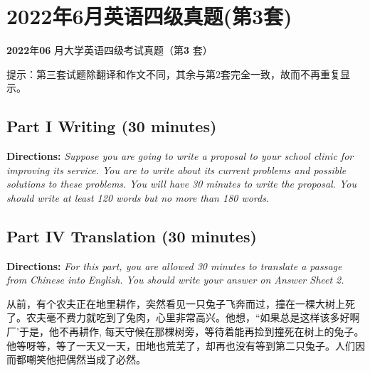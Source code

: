 \documentclass[UTF8,11pt]{ctexart}
\begin{document}
\section*{2022年6月英语四级真题(第3套)}
\textbf{2022}年\textbf{06} 月大学英语四级考试真题（第\textbf{3} 套）


提示：第三套试题除翻译和作文不同，其余与第2套完全一致，故而不再重复显示。


\subsection*{\textbf{Part I} \textbf{Writing} \textbf{(30 minutes)}}


\textbf{Directions: }\textit{Suppose you are going to write a proposal to your school clinic for improving its} \textit{service. You are to write about its current problems and possible solutions to these problems.} \textit{You will have 30 minutes to write the proposal. You should write at least 120 words but no more} \textit{than 180 words.}


\subsection*{\textbf{Part IV} \textbf{Translation} \textbf{(30 minutes)}}


\textbf{Directions: }\textit{For this part, you are allowed 30 minutes to translate a passage from Chinese into} \textit{English. You should write your answer on Answer Sheet 2.}


从前，有个农夫正在地里耕作，突然看见一只兔子飞奔而过，撞在一棵大树上死了。农夫毫不费力就吃到了兔肉，心里非常高兴。他想，“如果总是这样该多好啊厂'于是，他不再耕作, 每天守候在那棵树旁，等待着能再捡到撞死在树上的兔子。他等呀等，等了一天又一天，田地也荒芜了，却再也没有等到第二只兔子。人们因而都嘲笑他把偶然当成了必然。
\end{document}

